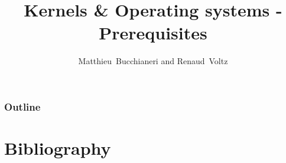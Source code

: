 %
%
%
%
%
%

%
%

%
%

\def\path{../../../..}

%
%



%
%

\title{Kernels \& Operating systems - Prerequisites}

%
%

\author
{
  Matthieu~Bucchianeri and Renaud~Voltz
}

%
%



%
%

\begin{frame}
  \titlepage
\end{frame}

%
%

\begin{frame}
  \frametitle{Outline}

  \tableofcontents
\end{frame}

%
%



%
%

\section{Bibliography}

\begin{thebibliography}{4}


\end{thebibliography}


